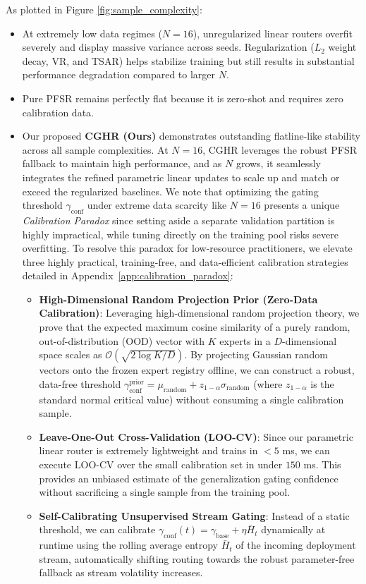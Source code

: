As plotted in Figure \ref{fig:sample_complexity}:
\begin{itemize}
    \item At extremely low data regimes ($N = 16$), unregularized linear routers overfit severely and display massive variance across seeds. Regularization ($L_2$ weight decay, VR, and TSAR) helps stabilize training but still results in substantial performance degradation compared to larger $N$.
    \item Pure PFSR remains perfectly flat because it is zero-shot and requires zero calibration data.
    \item Our proposed \textbf{CGHR (Ours)} demonstrates outstanding flatline-like stability across all sample complexities. At $N=16$, CGHR leverages the robust PFSR fallback to maintain high performance, and as $N$ grows, it seamlessly integrates the refined parametric linear updates to scale up and match or exceed the regularized baselines. We note that optimizing the gating threshold $\gamma_{\text{conf}}$ under extreme data scarcity like $N=16$ presents a unique \emph{Calibration Paradox} since setting aside a separate validation partition is highly impractical, while tuning directly on the training pool risks severe overfitting. To resolve this paradox for low-resource practitioners, we elevate three highly practical, training-free, and data-efficient calibration strategies detailed in Appendix~\ref{app:calibration_paradox}:
    \begin{itemize}
        \item \textbf{High-Dimensional Random Projection Prior (Zero-Data Calibration)}: Leveraging high-dimensional random projection theory, we prove that the expected maximum cosine similarity of a purely random, out-of-distribution (OOD) vector with $K$ experts in a $D$-dimensional space scales as $\mathcal{O}(\sqrt{2\log K / D})$. By projecting Gaussian random vectors onto the frozen expert registry offline, we can construct a robust, data-free threshold $\gamma_{\text{conf}}^{\text{prior}} = \mu_{\text{random}} + z_{1-\alpha} \sigma_{\text{random}}$ (where $z_{1-\alpha}$ is the standard normal critical value) without consuming a single calibration sample.
        \item \textbf{Leave-One-Out Cross-Validation (LOO-CV)}: Since our parametric linear router is extremely lightweight and trains in $<5$ ms, we can execute LOO-CV over the small calibration set in under $150$ ms. This provides an unbiased estimate of the generalization gating confidence without sacrificing a single sample from the training pool.
        \item \textbf{Self-Calibrating Unsupervised Stream Gating}: Instead of a static threshold, we can calibrate $\gamma_{\text{conf}}(t) = \gamma_{\text{base}} + \eta \bar{H}_t$ dynamically at runtime using the rolling average entropy $\bar{H}_t$ of the incoming deployment stream, automatically shifting routing towards the robust parameter-free fallback as stream volatility increases.
    \end{itemize}
\end{itemize}

